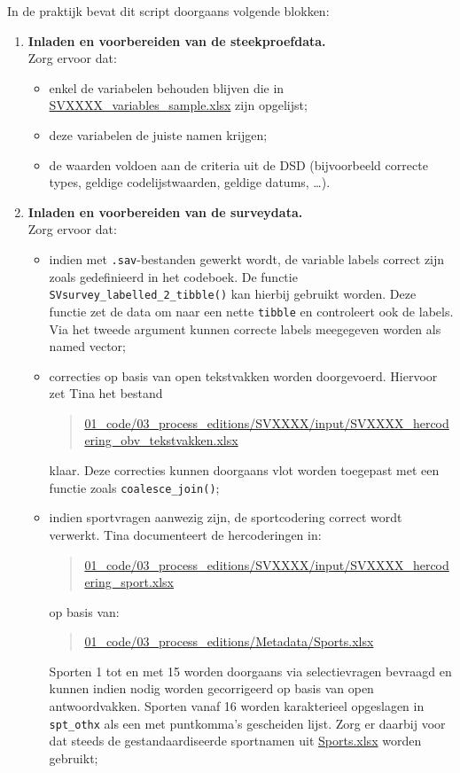 \documentclass{VSAnote}
\begin{document}
\begin{enumerate}
In de praktijk bevat dit script doorgaans volgende blokken:

\begin{enumerate}

\item \textbf{Inladen en voorbereiden van de steekproefdata.}\\
Zorg ervoor dat:
\begin{itemize}
\item enkel de variabelen behouden blijven die in \url{SVXXXX_variables_sample.xlsx} zijn opgelijst;
\item deze variabelen de juiste namen krijgen;
\item de waarden voldoen aan de criteria uit de DSD (bijvoorbeeld correcte types, geldige codelijstwaarden, geldige datums, \ldots).
\end{itemize}

\item \textbf{Inladen en voorbereiden van de surveydata.}\\
Zorg ervoor dat:
\begin{itemize}
\item indien met \texttt{.sav}-bestanden gewerkt wordt, de variable labels correct zijn zoals gedefinieerd in het codeboek. De functie \verb+SVsurvey_labelled_2_tibble()+ kan hierbij gebruikt worden. Deze functie zet de data om naar een nette \verb+tibble+ en controleert ook de labels. Via het tweede argument kunnen correcte labels meegegeven worden als named vector;
\item correcties op basis van open tekstvakken worden doorgevoerd. Hiervoor zet Tina het bestand
\begin{quote}
\url{01_code/03_process_editions/SVXXXX/input/SVXXXX_hercodering_obv_tekstvakken.xlsx}
\end{quote}
klaar. Deze correcties kunnen doorgaans vlot worden toegepast met een functie zoals \verb+coalesce_join()+;
\item indien sportvragen aanwezig zijn, de sportcodering correct wordt verwerkt. Tina documenteert de hercoderingen in:
\begin{quote}
\url{01_code/03_process_editions/SVXXXX/input/SVXXXX_hercodering_sport.xlsx}
\end{quote}
op basis van:
\begin{quote}
\url{01_code/03_process_editions/Metadata/Sports.xlsx}
\end{quote}

Sporten 1 tot en met 15 worden doorgaans via selectievragen bevraagd en kunnen indien nodig worden gecorrigeerd op basis van open antwoordvakken. Sporten vanaf 16 worden karakterieel opgeslagen in \verb+spt_othx+ als een met puntkomma's gescheiden lijst. Zorg er daarbij voor dat steeds de gestandaardiseerde sportnamen uit \url{Sports.xlsx} worden gebruikt;


\end{itemize}
\end{enumerate}
\end{enumerate}
\end{document}
